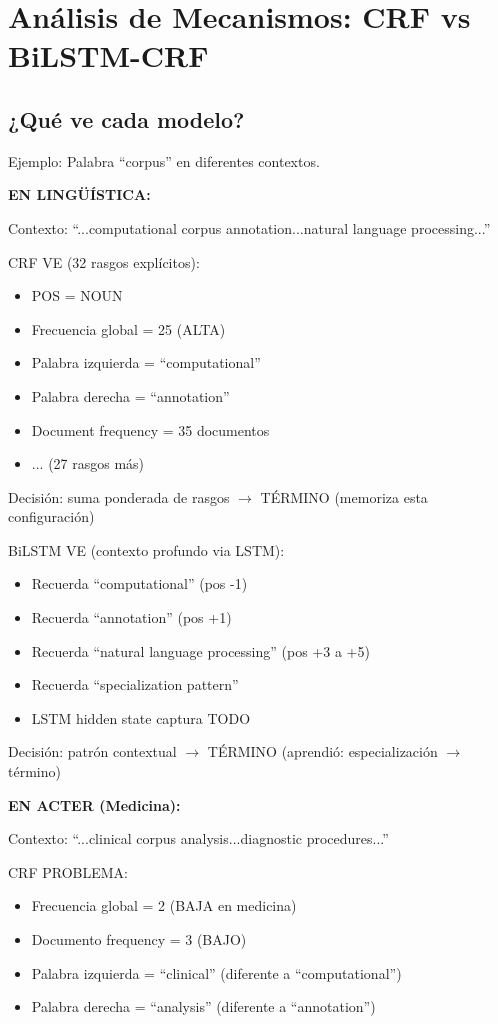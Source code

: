 \section{Análisis de Mecanismos: CRF vs BiLSTM-CRF}

\subsection{¿Qué ve cada modelo?}

Ejemplo: Palabra ``corpus'' en diferentes contextos.

\textbf{EN LINGÜÍSTICA:}

Contexto: ``...computational corpus annotation...natural language processing...''

CRF VE (32 rasgos explícitos):
\begin{itemize}
    \item POS = NOUN
    \item Frecuencia global = 25 (ALTA)
    \item Palabra izquierda = ``computational''
    \item Palabra derecha = ``annotation''
    \item Document frequency = 35 documentos
    \item ... (27 rasgos más)
\end{itemize}

Decisión: suma ponderada de rasgos $\rightarrow$ TÉRMINO (memoriza esta configuración)

BiLSTM VE (contexto profundo via LSTM):
\begin{itemize}
    \item Recuerda ``computational'' (pos -1)
    \item Recuerda ``annotation'' (pos +1)
    \item Recuerda ``natural language processing'' (pos +3 a +5)
    \item Recuerda ``specialization pattern''
    \item LSTM hidden state captura TODO
\end{itemize}

Decisión: patrón contextual $\rightarrow$ TÉRMINO (aprendió: especialización $\rightarrow$ término)

\textbf{EN ACTER (Medicina):}

Contexto: ``...clinical corpus analysis...diagnostic procedures...''

CRF PROBLEMA:
\begin{itemize}
    \item Frecuencia global = 2 (BAJA en medicina)
    \item Documento frequency = 3 (BAJO)
    \item Palabra izquierda = ``clinical'' (diferente a ``computational'')
    \item Palabra derecha = ``analysis'' (diferente a ``annotation'')
\end{itemize}

